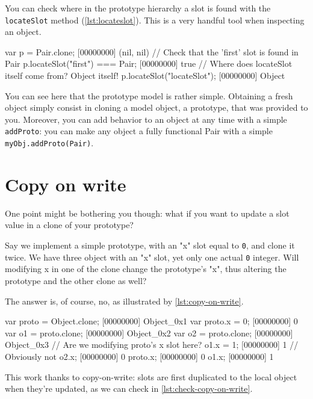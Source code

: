 You can check where in the prototype hierarchy a slot is found with
the \texttt{locateSlot} method (\autoref{lst:locateslot}). This is a very
handful tool when inspecting an object.

\begin{urbiscript}[caption=Using locateSlot, label=lst:locateslot]
var p = Pair.clone;
[00000000] (nil, nil)
// Check that the 'first' slot is found in Pair
p.locateSlot("first") === Pair;
[00000000] true
// Where does locateSlot itself come from? Object itself!
p.locateSlot("locateSlot");
[00000000] Object
\end{urbiscript}

You can see here that the prototype model is rather simple. Obtaining
a fresh object simply consist in cloning a model object, a prototype,
that was provided to you. Moreover, you can add behavior to an object
at any time with a simple \texttt{addProto}: you can make any object a
fully functional Pair with a simple \lstinline|myObj.addProto(Pair)|.

\section{Copy on write}

One point might be bothering you though: what if you want to update a
slot value in a clone of your prototype?

Say we implement a simple prototype, with an "x" slot equal to
\lstinline|0|, and clone it twice. We have three object with an "x"
slot, yet only one actual \lstinline|0| integer. Will modifying x in
one of the clone change the prototype's "x", thus altering the
prototype and the other clone as well?

The answer is, of course, no, as illustrated by \autoref{lst:copy-on-write}.

\begin{urbiscript}[caption=Copy on write in action,
  label=lst:copy-on-write, name=cow]
var proto = Object.clone;
[00000000] Object_0x1
var proto.x = 0;
[00000000] 0
var o1 = proto.clone;
[00000000] Object_0x2
var o2 = proto.clone;
[00000000] Object_0x3
// Are we modifying proto's x slot here?
o1.x = 1;
[00000000] 1
// Obviously not
o2.x;
[00000000] 0
proto.x;
[00000000] 0
o1.x;
[00000000] 1
\end{urbiscript}

This work thanks to copy-on-write: slots are first duplicated to the
local object when they're updated, as we can check in
\autoref{lst:check-copy-on-write}.

